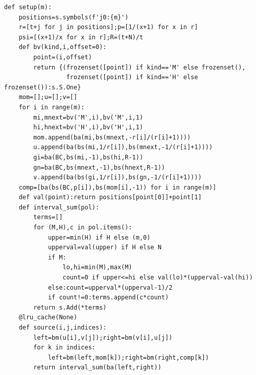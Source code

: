 \documentclass[11pt,a4paper]{article}
\numberwithin{equation}{section}
\theoremstyle{definition}\newtheorem{definition}[theorem]{Definition}
\theoremstyle{remark}\newtheorem{remark}[theorem]{Remark}
\begin{document}
\begin{lstlisting}
def setup(m):
    positions=s.symbols(f'j0:{m}')
    r=[t+j for j in positions];p=[1/(x+1) for x in r]
    psi=[(x+1)/x for x in r];R=(t+N)/t
    def bv(kind,i,offset=0):
        point=(i,offset)
        return {(frozenset([point]) if kind=='M' else frozenset(),
                 frozenset([point]) if kind=='H' else frozenset()):s.S.One}
    mom=[];u=[];v=[]
    for i in range(m):
        mi,mnext=bv('M',i),bv('M',i,1)
        hi,hnext=bv('H',i),bv('H',i,1)
        mom.append(ba(mi,bs(mnext,-r[i]/(r[i]+1))))
        u.append(ba(bs(mi,1/r[i]),bs(mnext,-1/(r[i]+1))))
        gi=ba(BC,bs(mi,-1),bs(hi,R-1))
        gn=ba(BC,bs(mnext,-1),bs(hnext,R-1))
        v.append(ba(bs(gi,1/r[i]),bs(gn,-1/(r[i]+1))))
    comp=[ba(bs(BC,p[i]),bs(mom[i],-1)) for i in range(m)]
    def val(point):return positions[point[0]]+point[1]
    def interval_sum(pol):
        terms=[]
        for (M,H),c in pol.items():
            upper=min(H) if H else (m,0)
            upperval=val(upper) if H else N
            if M:
                lo,hi=min(M),max(M)
                count=0 if upper<=hi else val(lo)*(upperval-val(hi))
            else:count=upperval*(upperval-1)/2
            if count!=0:terms.append(c*count)
        return s.Add(*terms)
    @lru_cache(None)
    def source(i,j,indices):
        left=bm(u[i],v[j]);right=bm(v[i],u[j])
        for k in indices:
            left=bm(left,mom[k]);right=bm(right,comp[k])
        return interval_sum(ba(left,right))


\end{lstlisting}
\end{document}
